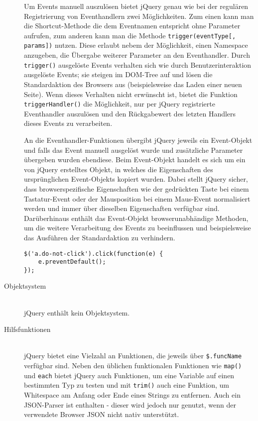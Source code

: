 \begin{description}
Um Events manuell auszulösen bietet jQuery genau wie bei der regulären Registrierung von
Eventhandlern zwei Möglichkeiten. Zum einen kann man die Shortcut-Methode die dem Eventnamen
entspricht ohne Parameter aufrufen, zum anderen kann man die Methode
\lstinline{trigger(eventType[, params])} nutzen. Diese erlaubt nebem der Möglichkeit, einen Namespace
anzugeben, die Übergabe weiterer Parameter an den Eventhandler. Durch \lstinline{trigger()}
ausgelöste Events verhalten sich wie durch Benutzerinteraktion ausgelöste Events; sie steigen im
DOM-Tree auf und lösen die Standardaktion des Browsers aus (beispielsweise das Laden einer neuen
Seite). Wenn dieses Verhalten nicht erwünscht ist, bietet die Funktion \lstinline{triggerHandler()}
die Möglichkeit, nur per jQuery registrierte Eventhandler auszulösen und den Rückgabewert des
letzten Handlers dieses Events zu verarbeiten.

An die Eventhandler-Funktionen übergibt jQuery jeweils ein Event-Objekt und falls das Event manuell
ausgelöst wurde und zusätzliche Parameter übergeben wurden ebendiese. Beim Event-Objekt handelt es
sich um ein von jQuery erstelltes Objekt, in welches die Eigenschaften des ursprünglichen
Event-Objekts kopiert wurden. Dabei stellt jQuery sicher, dass browserspezifische Eigenschaften wie
der gedrückten Taste bei einem Tastatur-Event oder der Mausposition bei einem Maus-Event
normalisiert werden und immer über dieselben Eigenschaften verfügbar sind. Darüberhinaus enthält das
Event-Objekt browserunabhändige Methoden, um die weitere Verarbeitung des Events zu beeinflussen und
beispielsweise das Ausführen der Standardaktion zu verhindern.

\begin{lstlisting}[caption=Blockieren des Click-Events einiger Links via jQuery]
$('a.do-not-click').click(function(e) {
    e.preventDefault();
});
\end{lstlisting}

\item[Objektsystem] \hfill \\
jQuery enthält kein Objektsystem.

\item[Hilfsfunktionen] \hfill \\
jQuery bietet eine Vielzahl an Funktionen, die jeweils über \lstinline{$.funcName} verfügbar sind.
Neben den üblichen funktionalen Funktionen wie \lstinline{map()} und \lstinline{each} bietet jQuery
auch Funktionen, um eine Variable auf einen bestimmten Typ zu testen und mit \lstinline{trim()} auch
eine Funktion, um Whitespace am Anfang oder Ende eines Strings zu entfernen. Auch ein JSON-Parser
ist enthalten - dieser wird jedoch nur genutzt, wenn der verwendete Browser JSON nicht nativ
unterstützt.


\end{description}
